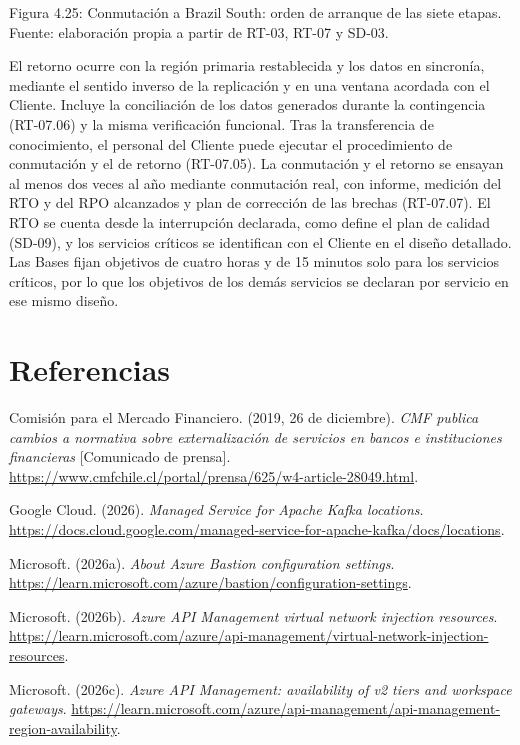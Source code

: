 \documentclass[11pt]{article}
\begin{document}
Figura 4.25: Conmutación a Brazil South: orden de arranque de las siete etapas. Fuente: elaboración propia a partir de RT-03, RT-07 y SD-03.

El retorno ocurre con la región primaria restablecida y los datos en sincronía, mediante el sentido inverso de la replicación y en una ventana acordada con el Cliente. Incluye la conciliación de los datos generados durante la contingencia (RT-07.06) y la misma verificación funcional. Tras la transferencia de conocimiento, el personal del Cliente puede ejecutar el procedimiento de conmutación y el de retorno (RT-07.05). La conmutación y el retorno se ensayan al menos dos veces al año mediante conmutación real, con informe, medición del RTO y del RPO alcanzados y plan de corrección de las brechas (RT-07.07). El RTO se cuenta desde la interrupción declarada, como define el plan de calidad (SD-09), y los servicios críticos se identifican con el Cliente en el diseño detallado. Las Bases fijan objetivos de cuatro horas y de 15 minutos solo para los servicios críticos, por lo que los objetivos de los demás servicios se declaran por servicio en ese mismo diseño.

\section*{Referencias}

Comisión para el Mercado Financiero. (2019, 26 de diciembre). \textit{CMF publica cambios a normativa sobre externalización de servicios en bancos e instituciones financieras} [Comunicado de prensa]. \url{https://www.cmfchile.cl/portal/prensa/625/w4-article-28049.html}.

Google Cloud. (2026). \textit{Managed Service for Apache Kafka locations}. \url{https://docs.cloud.google.com/managed-service-for-apache-kafka/docs/locations}.

Microsoft. (2026a). \textit{About Azure Bastion configuration settings}. \url{https://learn.microsoft.com/azure/bastion/configuration-settings}.

Microsoft. (2026b). \textit{Azure API Management virtual network injection resources}. \url{https://learn.microsoft.com/azure/api-management/virtual-network-injection-resources}.

Microsoft. (2026c). \textit{Azure API Management: availability of v2 tiers and workspace gateways}. \url{https://learn.microsoft.com/azure/api-management/api-management-region-availability}.
\end{document}
